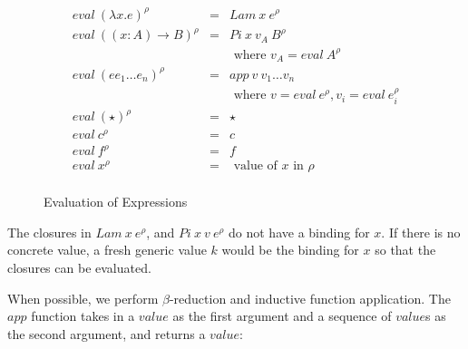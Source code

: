 \documentclass[acmsmall]{acmart}
\begin{document}
\begin{figure}[H]
  \begin{equation*}
    \begin{aligned}
      eval \: (\lambda x . e)^{\rho}   & = & Lam \: x \: e^{\rho}                                            \\
      eval \: ((x:A) \to B)^{\rho}     & = & Pi \: x \: v_A \: B^{\rho}                                      \\
                                       &   & \textrm{ where } v_A = eval \: A^{\rho}                         \\
      eval \: (e e_1 \dots e_n)^{\rho} & = & app \: v \: v_1 \dots v_n                                       \\
                                       &   & \textrm{ where } v = eval \: e^{\rho}, v_i = eval \: e_i^{\rho} \\
      eval \: (\star)^{\rho}           & = & \star                                                           \\
      eval \: c^{\rho}                 & = & c                                                               \\
      eval \: f^{\rho}                 & = & f                                                               \\
      eval \: x^{\rho}                 & = & \textrm{ value of } x \textrm{ in } \rho                        \\
    \end{aligned}
  \end{equation*}
  \caption{Evaluation of Expressions}
\end{figure}

The closures in $Lam \: x \: e^{\rho}$, and $Pi \: x \: v \: e^{\rho}$ do not have a
binding for $x$. If there is no concrete value, a fresh generic value $k$ would be
the binding for $x$ so that the closures can be evaluated.

When possible, we perform $\beta$-reduction and inductive function application. The $app$ function takes in a $value$ as the first argument and a sequence of
$value$s as the second argument, and returns a $value$: 
\end{document}
